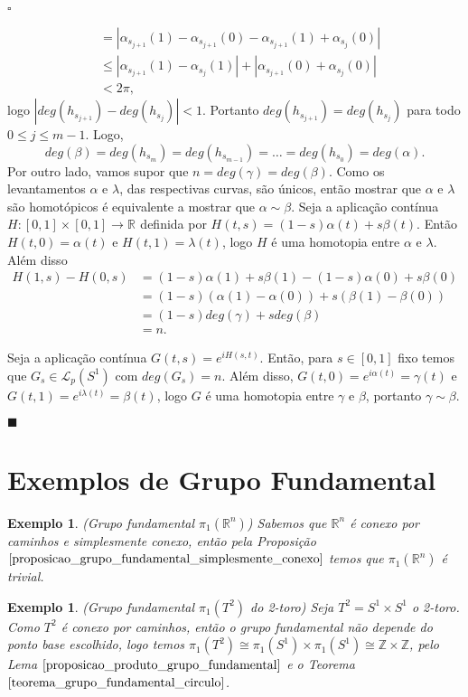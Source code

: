 \documentclass[12pt]{book}
\newtheorem{exemplo}[teorema]{Exemplo}
\newenvironment{prova}[1]{$\square$ #1}{\hfill$\blacksquare$}
\newcommand{\caminhospontobasegeral}[2]{\mathcal{L}_{#1}(#2)}
\newcommand{\circulo}{S^{1}}
\newcommand{\grupofundamental}[1]{\pi_{1}(#1)}
\newcommand{\inteiros}{\mathbb{Z}}
\newcommand{\real}[1]{\mathbb{R}^{#1}}
\begin{document}
\begin{prova}
\begin{enumerate}
$$\begin{aligned}
					&= |\alpha_{s_{j+1}}(1)-\alpha_{s_{j+1}}(0) - \alpha_{s_{j+1}}(1)+\alpha_{s_{j}}(0)|
					\\
					&\leq |\alpha_{s_{j+1}}(1)-\alpha_{s_{j}}(1)| + |\alpha_{s_{j+1}}(0)+\alpha_{s_{j}}(0)|
					\\
					&<2\pi,
				\end{aligned} 
				$$
				logo $|deg(h_{s_{j+1}})-deg(h_{s_{j}})| <1$. Portanto $deg(h_{s_{j+1}})=deg(h_{s_{j}})$ para todo $0\leq j \leq m-1$. Logo, 
				$$
				deg(\beta) = deg(h_{s_{m}})=deg(h_{s_{m-1}})=\dots=deg(h_{s_{0}}) = deg(\alpha).
				$$
				Por outro lado, vamos supor que $n = deg(\gamma)=deg(\beta)$. Como os levantamentos $\alpha$ e $\lambda$, das respectivas curvas, são únicos, então mostrar que $\alpha$ e $\lambda$ são homotópicos é equivalente a mostrar que $\alpha \sim \beta$. Seja a aplicação contínua $H:[0,1]\times [0,1] \to \real{}$ definida por $H(t,s) = (1-s)\alpha(t) + s\beta(t)$. Então $H(t,0)=\alpha(t)$ e $H(t,1)=\lambda(t)$, logo $H$ é uma homotopia entre $\alpha$ e $\lambda$. Além disso 
				$$
				\begin{aligned}
					H(1,s) - H(0,s) 
					&= (1-s)\alpha(1) + s\beta(1) - (1-s)\alpha(0) + s\beta(0) 
					\\
					&= (1-s)(\alpha(1)-\alpha(0)) + s(\beta(1)-\beta(0))
					\\
					&=(1-s)deg(\gamma) +sdeg(\beta)
					\\
					&= n.
				\end{aligned}
				$$ 
				
				Seja a aplicação contínua $G(t, s) = e^{iH(s,t)}$. Então, para $s \in [0,1]$ fixo temos que $G_{s} \in \caminhospontobasegeral{p}{\circulo}$ com $deg(G_{s}) = n$. Além disso, $G(t,0) = e^{i\alpha(t)} = \gamma(t)$ e $G(t,1) = e^{i\lambda(t)} = \beta(t)$, logo $G$ é uma homotopia entre $\gamma$ e $\beta$, portanto $\gamma \sim \beta$.
			\end{enumerate}
		\end{prova}
		
		\section{Exemplos de Grupo Fundamental}
		\begin{exemplo}
			(Grupo fundamental $\grupofundamental{\real{n}}$) Sabemos que $\real{n}$ é conexo por caminhos e simplesmente conexo, então pela Proposição $\ref{proposicao_grupo_fundamental_simplesmente_conexo}$ temos que $\grupofundamental{\real{n}}$ é trivial.
		\end{exemplo}
		\begin{exemplo}
			(Grupo fundamental $\grupofundamental{T^{2}}$ do 2-toro) Seja $T^{2}=\circulo \times \circulo$ o 2-toro. Como $T^{2}$ é conexo por caminhos, então o grupo fundamental não depende do ponto base escolhido, logo temos $\grupofundamental{T^{2}} \cong \grupofundamental{\circulo} \times \grupofundamental{\circulo} \cong \inteiros \times \inteiros$, pelo Lema $\ref{proposicao_produto_grupo_fundamental}$ e o Teorema $\ref{teorema_grupo_fundamental_circulo}$. 
		\end{exemplo}
		
\end{document}
